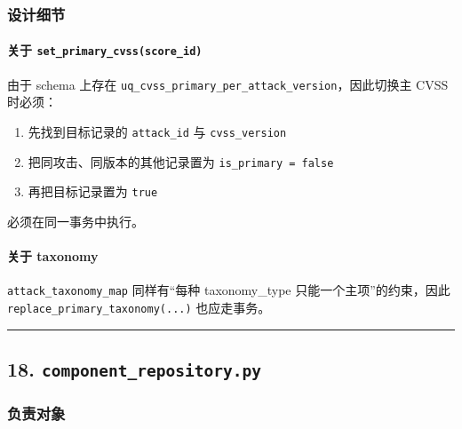 \documentclass[UTF8]{ctexart}
\providecommand{\tightlist}{%
  \setlength{\itemsep}{0pt}\setlength{\parskip}{0pt}}
\begin{document}
\hypertarget{ux8bbeux8ba1ux7ec6ux8282}{%
\subsubsection{设计细节}\label{ux8bbeux8ba1ux7ec6ux8282}}

\hypertarget{ux5173ux4e8e-set_primary_cvssscore_id}{%
\paragraph{\texorpdfstring{关于
\texttt{set\_primary\_cvss(score\_id)}}{关于 set\_primary\_cvss(score\_id)}}\label{ux5173ux4e8e-set_primary_cvssscore_id}}

由于 schema 上存在
\texttt{uq\_cvss\_primary\_per\_attack\_version}，因此切换主 CVSS
时必须：

\begin{enumerate}
\def\labelenumi{\arabic{enumi}.}
\tightlist
\item
  先找到目标记录的 \texttt{attack\_id} 与 \texttt{cvss\_version}
\item
  把同攻击、同版本的其他记录置为 \texttt{is\_primary\ =\ false}
\item
  再把目标记录置为 \texttt{true}
\end{enumerate}

必须在同一事务中执行。

\hypertarget{ux5173ux4e8e-taxonomy}{%
\paragraph{关于 taxonomy}\label{ux5173ux4e8e-taxonomy}}

\texttt{attack\_taxonomy\_map} 同样有``每种 taxonomy\_type
只能一个主项''的约束，因此 \texttt{replace\_primary\_taxonomy(...)}
也应走事务。

\begin{center}\rule{0.5\linewidth}{0.5pt}\end{center}

\hypertarget{component_repository.py}{%
\subsection{\texorpdfstring{18.
\texttt{component\_repository.py}}{18. component\_repository.py}}\label{component_repository.py}}

\hypertarget{ux8d1fux8d23ux5bf9ux8c61-2}{%
\subsubsection{负责对象}\label{ux8d1fux8d23ux5bf9ux8c61-2}}
\end{document}
